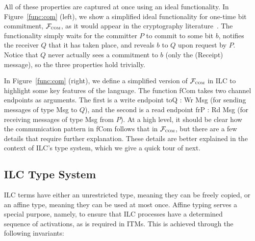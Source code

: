 %
All of these properties are captured at once using an ideal functionality. In
Figure~\ref{func:com} (left), we show a simplified ideal functionality for
one-time bit commitment, $\mathcal{{F}}_{\textsc{com}}$, as it would appear in the
cryptography literature~\cite{canetti2001commitments}. The functionality simply
waits for the committer $P$ to commit to some bit $b$, notifies the receiver $Q$
that it has taken place, and reveals $b$ to $Q$ upon request by $P$. Notice that
$Q$ never actually sees a commitment to $b$ (only the (\textsf{Receipt})
message), so the three properties hold trivially.
%

In Figure~\ref{func:com} (right), we define a simplified version of
$\mathcal{{F}}_{\textsc{com}}$ in ILC to highlight some key features of the
language. The function \textsf{fCom} takes two channel endpoints as
arguments. The first is a write endpoint \textsf{toQ : Wr Msg} (for
sending messages of type \textsf{Msg} to $Q$), and the second is a read endpoint
\textsf{frP : Rd Msg} (for receiving messages of type \textsf{Msg} from $P$). At
a high level, it should be clear how the communication pattern in \textsf{fCom}
follows that in $\mathcal{{F}}_{\textsc{com}}$, but there are a few details that require
further explanation. These details are better explained in the context of ILC's
type system, which we give a quick tour of next.

\subsection{ILC Type System}
\label{subsec:type-tour}

ILC terms have either an unrestricted type, meaning they can be freely copied,
or an affine type, meaning they can be used at most once. Affine typing serves a
special purpose, namely, to ensure that ILC processes have a determined sequence
of activations, as is required in ITMs. This is achieved through the following
invariants:


